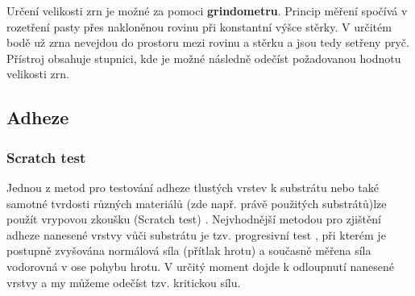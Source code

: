       Určení velikosti zrn je možné za pomoci \textbf{grindometru}\cite{zadani}. Princip měření spočívá v rozetření pasty přes nakloněnou rovinu při konstantní výšce stěrky. V určitém bodě už zrna nevejdou do prostoru mezi rovinu a stěrku a jsou tedy setřeny pryč. Přístroj obsahuje stupnici, kde je možné následně odečíst požadovanou hodnotu velikosti zrn. 
	
    \subsection{Adheze}
      \subsubsection{Scratch test}
      Jednou z metod pro testování adheze tlustých vrstev k substrátu nebo také samotné tvrdosti různých materiálů (zde např. právě použitých substrátů)lze použít vrypovou zkoušku (Scratch test) \cite{DiplomkaScratchTester}. 
      Nejvhodnější metodou pro zjištění adheze nanesené vrstvy vůči substrátu je tzv. progresivní test \cite{DiplomkaScratchTester}, při kterém je postupně zvyšována normálová síla (přítlak hrotu) a současně měřena síla vodorovná v ose pohybu hrotu. V určitý moment dojde k odloupnutí nanesené vrstvy a my můžeme odečíst tzv. kritickou sílu. 